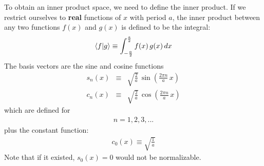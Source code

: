 \documentclass[12pt]{book}
\begin{document}
To obtain an inner product space, we need to define the inner product. If we restrict ourselves to {\bf real} functions of $x$ with period $a$, the inner product between any two functions $f(x)$ and $g(x)$ is defined to be the integral:
\begin{equation}
\braket{f|g} \equiv \int_{-\frac{a}{2}}^{\frac{a}{2}} f(x) \, g(x) \, dx
\end{equation}
The basis vectors are the sine and cosine functions
\begin{eqnarray}
s_n(x) &\equiv& \sqrt{\frac{2}{a}}\,\sin\left(\frac{2\pi n}{a} \, x \right)\\
c_n(x) &\equiv& \sqrt{\frac{2}{a}}\,\cos\left(\frac{2\pi n}{a} \, x \right)
\end{eqnarray}
which are defined for
\begin{eqnarray*}
n = 1,2,3,...
\end{eqnarray*}
plus the constant function:
\begin{eqnarray}
c_0(x) \equiv \sqrt{\frac{1}{a}}
\end{eqnarray}
Note that if it existed, $s_0(x) = 0$ would not be normalizable.
\end{document}
